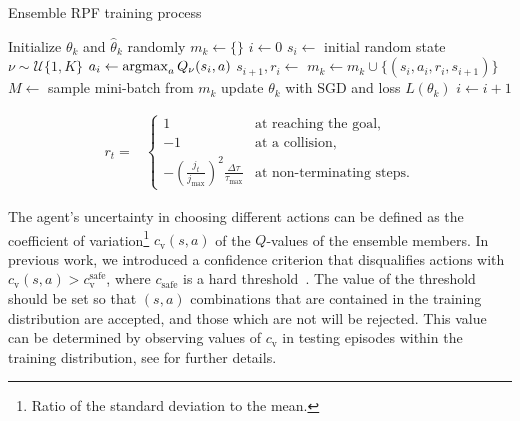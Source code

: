 \begin{algorithm}[h]
	\caption{Ensemble RPF training process}\label{alg:training}
	\begin{algorithmic}[1]
			\State Initialize $\theta_k$ and $\hat{\theta}_k$ randomly
			\State $m_k \gets \{\}$
		\EndFor
		\State $i \gets 0$
			\State $s_i \gets $ initial random state
			\State $\nu \sim \mathcal{U}\{1,K\}$%
				\State $a_i \gets \operatorname*{argmax}_{a} Q_\nu(s_i,a)$
				\State $s_{i+1}, r_i \gets $ 
						\State $m_k \gets m_k \cup \{(s_i, a_i, r_i, s_{i+1})\}$
					\EndIf
					\State $M \gets $ sample mini-batch from $m_k$
					\State update $\theta_k$ with SGD and loss $L(\theta_k)$
				\EndFor
				\State $i \gets i + 1$
			\EndWhile
		\EndWhile
	\end{algorithmic}
\end{algorithm}

\begin{align*}
r_t = &\begin{cases}
1 & \text{at reaching the goal, }\\
-1 & \text{at a collision},\\
-\left(\frac{j_t}{j_{\max}}\right)^2\frac{\Delta \tau}{\tau_\mathrm{max}} & \text{at non-terminating steps.}
\end{cases} 
\end{align*}



The agent's uncertainty in choosing different actions can be defined as the coefficient of variation\footnote{Ratio of the standard deviation to the mean.} $c_\mathrm{v}(s,a)$ of the $Q$-values of the ensemble members.  
In previous work, we introduced a confidence criterion that disqualifies actions with $c_\mathrm{v}(s,a) > c_\mathrm{v}^\mathrm{safe}$, where $c_\mathrm{safe}$ is a hard threshold~\cite{Hoel2020}. 
The value of the threshold should be set so that $(s,a)$ combinations that are contained in the training distribution are accepted, and those which are not will be rejected. This value can be determined by observing values of $c_\mathrm{v}$ in testing episodes within the training distribution, see \paperEnsamble for further details. 




